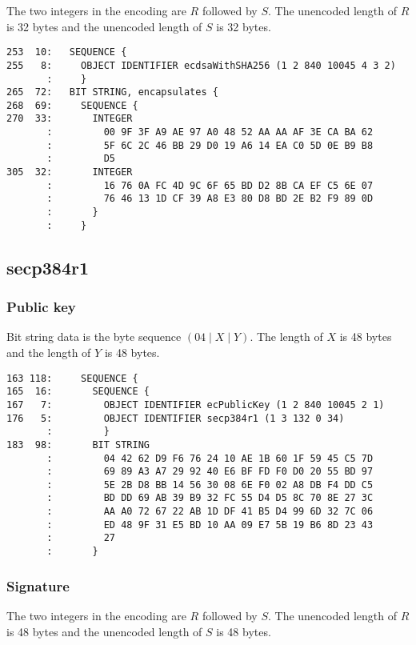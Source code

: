 \documentclass[12pt]{article}
\begin{document}
\noindent
The two integers in the encoding are $R$ followed by $S$.
The unencoded length of $R$ is 32 bytes and the unencoded length of $S$ is 32 bytes.

\begin{verbatim}
253  10:   SEQUENCE {
255   8:     OBJECT IDENTIFIER ecdsaWithSHA256 (1 2 840 10045 4 3 2)
       :     }
265  72:   BIT STRING, encapsulates {
268  69:     SEQUENCE {
270  33:       INTEGER
       :         00 9F 3F A9 AE 97 A0 48 52 AA AA AF 3E CA BA 62
       :         5F 6C 2C 46 BB 29 D0 19 A6 14 EA C0 5D 0E B9 B8
       :         D5
305  32:       INTEGER
       :         16 76 0A FC 4D 9C 6F 65 BD D2 8B CA EF C5 6E 07
       :         76 46 13 1D CF 39 A8 E3 80 D8 BD 2E B2 F9 89 0D
       :       }
       :     }
\end{verbatim}

\newpage
\subsection{secp384r1}

\subsubsection{Public key}

\noindent
Bit string data is the byte sequence $(04\mid X\mid Y)$.
The length of $X$ is 48 bytes and the length of $Y$ is 48 bytes.

\begin{verbatim}
163 118:     SEQUENCE {
165  16:       SEQUENCE {
167   7:         OBJECT IDENTIFIER ecPublicKey (1 2 840 10045 2 1)
176   5:         OBJECT IDENTIFIER secp384r1 (1 3 132 0 34)
       :         }
183  98:       BIT STRING
       :         04 42 62 D9 F6 76 24 10 AE 1B 60 1F 59 45 C5 7D
       :         69 89 A3 A7 29 92 40 E6 BF FD F0 D0 20 55 BD 97
       :         5E 2B D8 BB 14 56 30 08 6E F0 02 A8 DB F4 DD C5
       :         BD DD 69 AB 39 B9 32 FC 55 D4 D5 8C 70 8E 27 3C
       :         AA A0 72 67 22 AB 1D DF 41 B5 D4 99 6D 32 7C 06
       :         ED 48 9F 31 E5 BD 10 AA 09 E7 5B 19 B6 8D 23 43
       :         27
       :       }
\end{verbatim}

\subsubsection{Signature}

\noindent
The two integers in the encoding are $R$ followed by $S$.
The unencoded length of $R$ is 48 bytes and the unencoded length of $S$ is 48 bytes.
\end{document}

